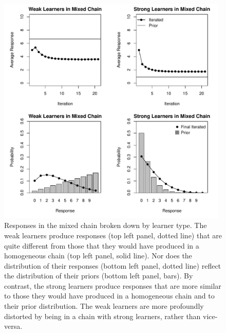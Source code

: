\documentclass[doc]{apa6}
\begin{document}
\begin{figure}[t]
\begin{center}
\includegraphics[width=11cm]{coinsfail2.pdf}
\caption{\small{Responses in the mixed chain broken down by learner type. The {\sc weak} learners produce responses (top left panel, dotted line) that are quite different from those that they would have produced in a homogeneous chain (top left panel, solid line). Nor does the distribution of their responses (bottom left panel, dotted line)  reflect the distribution of their priors (bottom left panel, bars). By contrast, the {\sc strong} learners produce responses that are more similar to those they would have produced in a homogeneous chain and to their prior distribution. The {\sc weak} learners are more profoundly distorted by being in a chain with {\sc strong} learners, rather than vice-versa.}}
\label{coinsfail2}
\end{center}
\end{figure}
\end{document}
